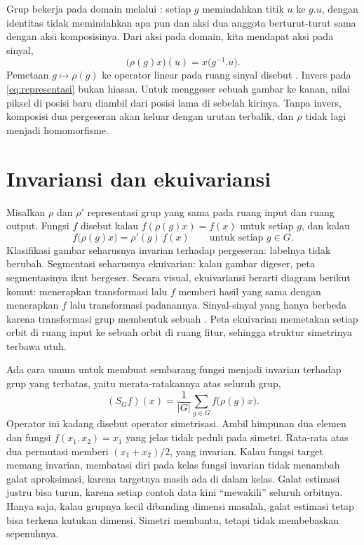 Grup bekerja pada domain melalui : setiap $g$ memindahkan titik $u$ ke $g.u$,
dengan identitas tidak memindahkan apa pun dan aksi dua anggota berturut-turut sama dengan aksi
komposisinya. Dari aksi pada domain, kita mendapat aksi pada sinyal,
\begin{equation}
\big(\rho(g)x\big)(u)=x\big(g^{-1}.u\big).
\label{eq:representasi}
\end{equation}
Pemetaan $g\mapsto\rho(g)$ ke operator linear pada ruang sinyal disebut . Invers
pada \cref{eq:representasi} bukan hiasan. Untuk menggeser sebuah gambar ke kanan, nilai piksel di
posisi baru diambil dari posisi lama di sebelah kirinya. Tanpa invers, komposisi dua pergeseran
akan keluar dengan urutan terbalik, dan $\rho$ tidak lagi menjadi homomorfisme.

\section{Invariansi dan ekuivariansi}

Misalkan $\rho$ dan $\rho'$ representasi grup yang sama pada ruang input dan ruang output. Fungsi
$f$ disebut  kalau $f(\rho(g)x)=f(x)$ untuk setiap $g$, dan  kalau
\begin{equation}
f\big(\rho(g)x\big)=\rho'(g)\,f(x)\qquad\text{untuk setiap }g\in G.
\end{equation}
Klasifikasi gambar seharusnya invarian terhadap pergeseran: labelnya tidak berubah. Segmentasi
seharusnya ekuivarian: kalau gambar digeser, peta segmentasinya ikut bergeser. Secara visual,
ekuivariansi berarti diagram berikut komut: menerapkan transformasi lalu $f$ memberi hasil yang sama
dengan menerapkan $f$ lalu transformasi padanannya. Sinyal-sinyal yang hanya berbeda karena
transformasi grup membentuk sebuah . Peta ekuivarian memetakan setiap orbit di ruang
input ke sebuah orbit di ruang fitur, sehingga struktur simetrinya terbawa utuh.

Ada cara umum untuk membuat sembarang fungsi menjadi invarian terhadap grup yang terbatas, yaitu
merata-ratakannya atas seluruh grup,
\begin{equation}
(S_Gf)(x)=\frac1{|G|}\sum_{g\in G}f\big(\rho(g)x\big).
\end{equation}
Operator ini kadang disebut operator simetrisasi. Ambil himpunan dua elemen dan fungsi
$f(x_1,x_2)=x_1$ yang jelas tidak peduli pada simetri. Rata-rata atas dua permutasi memberi
$(x_1+x_2)/2$, yang invarian. Kalau fungsi target memang invarian, membatasi diri pada kelas fungsi
invarian tidak menambah galat aproksimasi, karena targetnya masih ada di dalam kelas. Galat
estimasi justru bisa turun, karena setiap contoh data kini ``mewakili'' seluruh orbitnya. Hanya
saja, kalau grupnya kecil dibanding dimensi masalah, galat estimasi tetap bisa terkena kutukan
dimensi. Simetri membantu, tetapi tidak membebaskan sepenuhnya.

